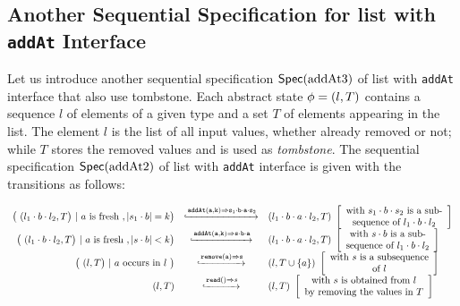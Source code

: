 \subsection{Another Sequential Specification for list with {\tt addAt} Interface}
\label{subsec:another sequential specification for list with addAt interface}

Let us introduce another sequential specification $\mathsf{Spec}(\text{addAt3})$ of list with {\tt addAt} interface that also use tombstone. Each abstract state $\phi = (l,T)$ contains a sequence $l$ of elements of a given type and a set $T$ of elements appearing in the list. The element $l$ is the list of all input values, whether already removed or not; while $T$ stores the removed values and is used as \emph{tombstone}. The sequential specification $\mathsf{Spec}(\text{addAt2})$ of list with {\tt addAt} interface is given with the transitions as follows:

\[
  \begin{array}{rcl}
    \big(\ (l_1 \cdot b \cdot l_2,T\big)\ |\ a\text{ is fresh}\ , \vert s_1 \cdot b\vert = k \big)
     & \specarrow{\alabellong[{\tt addAt}]{a,k}{s_1 \cdot b \cdot a \cdot s_2}{}}
     & (l_1 \cdot b \cdot a \cdot l_2,T)\
       \left[\begin{array}{c}
           \text{with $s_1 \cdot b \cdot s_2$ is a sub-}\\
           \text{sequence of $l_1 \cdot b \cdot l_2$}
       \end{array}\right]\\
     \big(\ (l_1 \cdot b \cdot l_2,T\big)\ |\ a\text{ is fresh}\ , \vert s \cdot b \vert <k \big)
     & \specarrow{\alabellong[{\tt addAt}]{a,k}{s \cdot b \cdot a}{}}
     & (l_1 \cdot b \cdot a \cdot l_2,T)\
       \left[\begin{array}{c}
           \text{with $s \cdot b$ is a sub-}\\
           \text{sequence of $l_1 \cdot b \cdot l_2$}
       \end{array}\right]\\
     \big(\ (l,T\big)\ |\ a\ \text{occurs in}\ l\ \big)
     & \specarrow{\alabellong[{\tt remove}]{a}{s}{}}
     & (l,T \cup \{ a \})\
       \left[\begin{array}{c}
           \text{with $s$ is a subsequence}\\
           \text{of $l$}
       \end{array}\right]\\ 
     (l,T)
     & \specarrow{\alabellong[\mathtt{read}]{}{s}{}}
     & (l,T)\
       \left[\begin{array}{c}
           \text{with $s$ is obtained from $l$}\\
           \text{by removing the values in $T$}
       \end{array}\right]
   \end{array}
\] 

